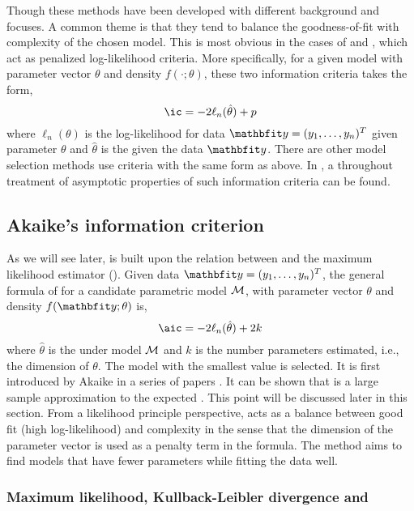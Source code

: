 Though these methods have been developed with different background and
focuses. A common theme is that they tend to balance the goodness-of-fit with
complexity of the chosen model. This is most obvious in the cases of \aic and
\bic, which act as penalized log-likelihood criteria. More specifically, for a
given model with parameter vector $\theta$ and density $f(\cdot;\theta)$,
these two information criteria takes the form,
\begin{equation}
  \text{\ic} = -2\ell_n(\hat\theta) + p
  \label{eq:ic}
\end{equation}
where $\ell_n(\theta)$ is the log-likelihood for data $\data =
(y_1,\dots,y_n)^T$ given parameter $\theta$ and $\hat\theta$ is the \mle given
the data $\data$. There are other model selection methods use criteria with
the same form as above. In \cite{Sin:1996vs}, a throughout treatment of
asymptotic properties of such information criteria can be found.

\subsection{Akaike's information criterion}
\label{sub:Akaike's information criterion}

As we will see later, \aic is built upon the relation between \kl and the
maximum likelihood estimator (\mle). Given data $\data = (y_1,\dots,y_n)^T$,
the general formula of \aic for a candidate parametric model $\mathcal{M}$, with
parameter vector $\theta$ and density $f(\data;\theta)$ is,
\begin{equation}
  \text{\aic} = -2\ell_n(\hat\theta) + 2k
  \label{eq:aic}
\end{equation}
where $\hat\theta$ is the \mle under model $\mathcal{M}$ and $k$ is the number
parameters estimated, i.e., the dimension of $\theta$. The model with the
smallest \aic value is selected. It is first introduced by Akaike in a series
of papers \cite{Akaike:1973uc, Akaike:1974ih, Akaike:1977ul}. It can be shown
that \aic is a large sample approximation to the expected \kl
\cite{Akaike:1973uc,Bozdogan:1987wy}. This point will be discussed later in
this section. From a likelihood principle perspective, \aic acts as a balance
between good fit (high log-likelihood) and complexity in the sense that the
dimension of the parameter vector is used as a penalty term in the formula.
The \aic method aims to find models that have fewer parameters while fitting
the data well.

\subsubsection{Maximum likelihood, Kullback-Leibler divergence and
  \protect\aic}
\label{ssub:Maximum likelihood, Kullback-Leiber divergence and aic}

